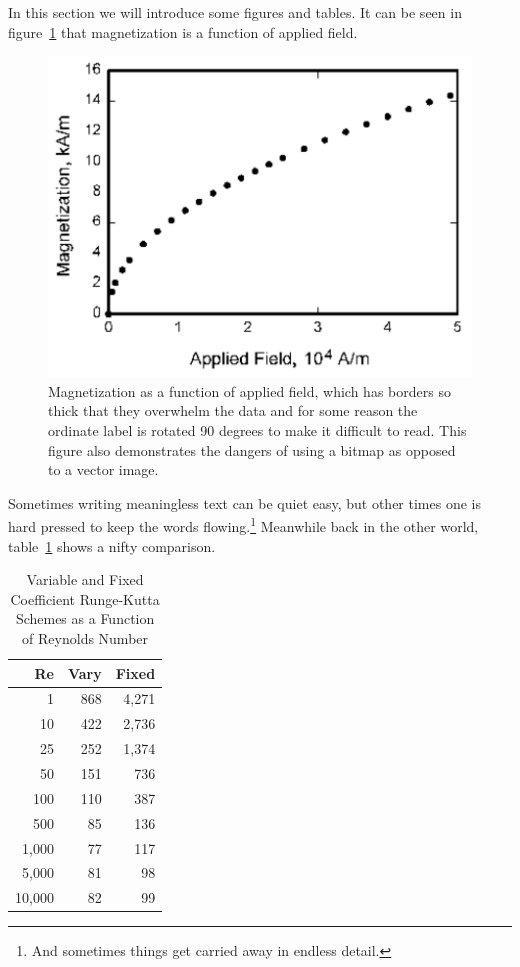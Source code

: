 \documentclass[]{aiaa-tc}%
\begin{document}
In this section we will introduce some figures and tables.
It can be seen in figure~\ref{f:magnetic_field} that magnetization is a
function of applied field.
\begin{figure}[htb]%
 \includegraphics{figure_magnet}
 \caption{Magnetization as a function of applied field, which has
   borders so thick that they overwhelm the data and for some reason the
   ordinate label is rotated 90 degrees to make it difficult to
   read. This figure also demonstrates the dangers of using a bitmap
   as opposed to a vector image.}
 \label{f:magnetic_field}
\end{figure}
Sometimes writing meaningless text can be quiet easy, but other times
one is hard pressed to keep the words flowing.\footnote{And sometimes
things get carried away in endless detail.}
Meanwhile back in the other world, table~\ref{t:scheme_comparison} shows
a nifty comparison.
\begin{table}%
 \begin{center}
  \caption{Variable and Fixed Coefficient Runge-Kutta Schemes as a
           Function of Reynolds Number}
  \label{t:scheme_comparison}
  \begin{tabular}{rrr}
       Re & Vary & Fixed \\\hline
        1 &  868 & 4,271 \\
       10 &  422 & 2,736 \\
       25 &  252 & 1,374 \\
       50 &  151 &   736 \\
      100 &  110 &   387 \\
      500 &   85 &   136 \\
    1,000 &   77 &   117 \\
    5,000 &   81 &    98 \\
   10,000 &   82 &    99
  \end{tabular}
 \end{center}
\end{table}
\end{document}
